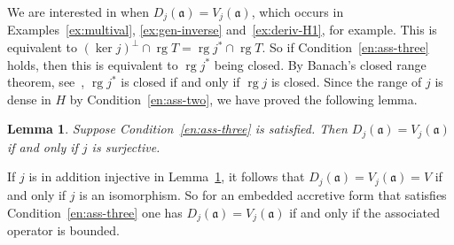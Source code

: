 \documentclass[a4paper,oneside,12pt]{amsart}
\theoremstyle{plain}
\newtheorem{lemma}[theorem]{Lemma}
\theoremstyle{definition}
\begin{document}
We are interested in when $D_j({{\mathfrak{{a}}}})=V_j({{\mathfrak{{a}}}})$, which occurs in Examples~\ref{ex:multival}, \ref{ex:gen-inverse} and~\ref{ex:deriv-H1}, for example.
This is equivalent to $(\ker j)^\perp\cap\operatorname{rg} T=\operatorname{rg} j^*\cap\operatorname{rg} T$. So if Condition~\ref{en:ass-three} holds,
then this is equivalent to $\operatorname{rg} j^*$ being closed. 
By Banach's closed range theorem, see~\cite[Theorem~IV.5.13]{Kat1}, $\operatorname{rg} j^*$ is closed if and only if $\operatorname{rg} j$ is closed. 
Since the range of $j$ is dense in $H$ by Condition~\ref{en:ass-two}, we have proved the following lemma.
\begin{lemma}\label{lem:DHa-eq-Va}
Suppose Condition~\ref{en:ass-three} is satisfied. Then $D_j({{\mathfrak{{a}}}})=V_j({{\mathfrak{{a}}}})$ if and only if $j$ is surjective.
\end{lemma}
If $j$ is in addition injective in Lemma~\ref{lem:DHa-eq-Va},
it follows that $D_j({{\mathfrak{{a}}}})=V_j({{\mathfrak{{a}}}})=V$ if and only if $j$ is an isomorphism. So for an embedded accretive form that satisfies Condition~\ref{en:ass-three} one has $D_j({{\mathfrak{{a}}}})=V_j({{\mathfrak{{a}}}})$ if and only if the associated operator is bounded.
\end{document}
